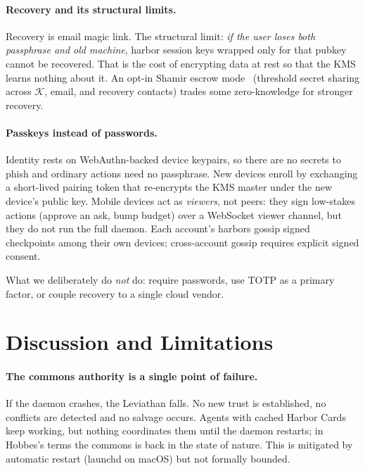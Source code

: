 \documentclass[11pt,a4paper]{article}
\theoremstyle{definition}
\theoremstyle{remark}
\begin{document}
\paragraph{Recovery and its structural limits.} Recovery is email magic link. The structural limit: \emph{if the user loses both passphrase and old machine}, harbor session keys wrapped only for that pubkey cannot be recovered. That is the cost of encrypting data at rest so that the KMS learns nothing about it. An opt-in Shamir escrow mode~ (threshold secret sharing across $\mathcal{K}$, email, and recovery contacts) trades some zero-knowledge for stronger recovery.

\paragraph{Passkeys instead of passwords.} Identity rests on WebAuthn-backed device keypairs, so there are no secrets to phish and ordinary actions need no passphrase. New devices enroll by exchanging a short-lived pairing token that re-encrypts the KMS master under the new device's public key. Mobile devices act as \emph{viewers}, not peers: they sign low-stakes actions (approve an ask, bump budget) over a WebSocket viewer channel, but they do not run the full daemon. Each account's harbors gossip signed checkpoints among their own devices; cross-account gossip requires explicit signed consent.

What we deliberately do \emph{not} do: require passwords, use TOTP as a primary factor, or couple recovery to a single cloud vendor.

\pdexercisepointerone{\ref{ex:bonded-magic-link-proverif}}{\pageref{ex:bonded-magic-link-proverif}}

\section{Discussion and Limitations}\label{sec:discussion-limitations}

\paragraph{The commons authority is a single point of failure.} If the daemon crashes, the Leviathan falls. No new trust is established, no conflicts are detected and no salvage occurs. Agents with cached Harbor Cards keep working, but nothing coordinates them until the daemon restarts; in Hobbes's terms the commons is back in the state of nature. This is mitigated by automatic restart (launchd on macOS) but not formally bounded.
\end{document}
